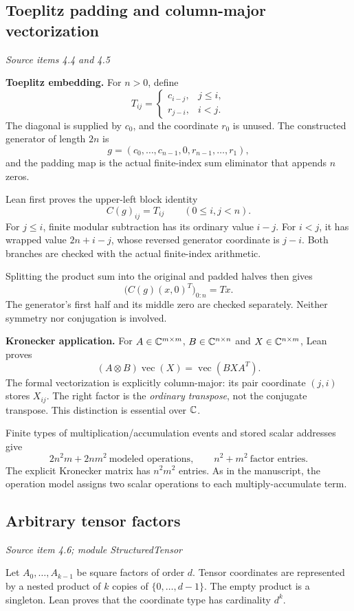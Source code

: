 \subsection{Toeplitz padding and column-major vectorization}\label{supp4:subsection:002}\textit{Source items 4.4 and 4.5}\par
\textbf{Toeplitz embedding.} For $n>0$, define
\[
T_{ij}=
\begin{cases}
c_{i-j},&j\le i,\\
r_{j-i},&i<j.
\end{cases}
\]
The diagonal is supplied by $c_0$, and the coordinate $r_0$ is unused. The constructed generator of length $2n$ is
\[
g=(c_0,\ldots,c_{n-1},0,r_{n-1},\ldots,r_1),
\]
and the padding map is the actual finite-index sum eliminator that appends $n$ zeros.

Lean first proves the upper-left block identity
\[
C(g)_{ij}=T_{ij}\qquad(0\le i,j<n).
\]
For $j\le i$, finite modular subtraction has its ordinary value $i-j$. For $i<j$, it has wrapped value $2n+i-j$, whose reversed generator coordinate is $j-i$. Both branches are checked with the actual finite-index arithmetic.

Splitting the product sum into the original and padded halves then gives
\[
\boxed{\bigl(C(g)(x,0)^T\bigr)_{0:n}=Tx.}
\]
The generator's first half and its middle zero are checked separately. Neither symmetry nor conjugation is involved.

\textbf{Kronecker application.} For $A\in\C^{m\times m}$, $B\in\C^{n\times n}$ and $X\in\C^{n\times m}$, Lean proves
\[
\boxed{(A\otimes B)\operatorname{vec}(X)=\operatorname{vec}(BXA^T).}
\]
The formal vectorization is explicitly column-major: its pair coordinate $(j,i)$ stores $X_{ij}$. The right factor is the \emph{ordinary transpose}, not the conjugate transpose. This distinction is essential over $\C$.

Finite types of multiplication/accumulation events and stored scalar addresses give
\[
\boxed{2n^2m+2nm^2\ \text{modeled operations},\qquad n^2+m^2\ \text{factor entries}.}
\]
The explicit Kronecker matrix has $n^2m^2$ entries. As in the manuscript, the operation model assigns two scalar operations to each multiply-accumulate term.



\subsection{Arbitrary tensor factors}\label{supp4:subsection:003}\textit{Source item 4.6; module StructuredTensor}\par
Let $A_0,\ldots,A_{k-1}$ be square factors of order $d$. Tensor coordinates are represented by a nested product of $k$ copies of $\{0,\ldots,d-1\}$. The empty product is a singleton. Lean proves that the coordinate type has cardinality $d^k$.

